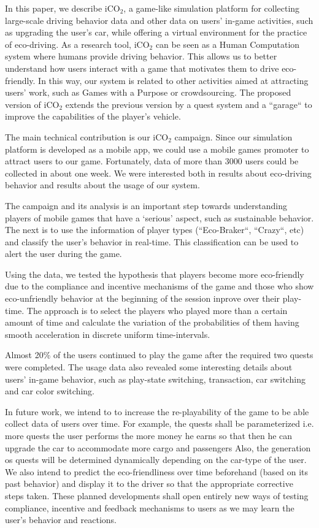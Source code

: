 \documentclass[preprint,authoryear,12pt]{elsarticle}
\begin{document}
In this paper, we describe iCO$_2$, a game-like simulation platform for collecting large-scale driving behavior data and other data on users' in-game activities, such as upgrading the user's car, while offering a virtual environment for the practice of eco-driving. As a research tool, iCO$_2$ can be seen as a Human Computation system where humans provide driving behavior. This allows us to better understand how users interact with a game that motivates them to drive eco-friendly. In this way, our system is related to other activities aimed at attracting users' work, such as Games with a Purpose or crowdsourcing. The proposed version of iCO$_2$ extends the previous version \citep{prendingeroliveira2014} by a quest system and a ``garage`` to improve the capabilities of the player's vehicle.

The main technical contribution is our iCO$_2$ campaign. Since our simulation platform is developed as a mobile app, we could use a mobile games promoter to attract users to our game. Fortunately, data of more than 3000 users could be collected in about one week. We were interested both in results about eco-driving behavior and results about the usage of our system.

The campaign and its analysis is an important step towards understanding players of mobile games that have a `serious' aspect, such as sustainable behavior. The next is to use the information of player types (``Eco-Braker``, ``Crazy``, etc) and classify the user's behavior in real-time. This classification can be used to alert the user during the game.

Using the data, we tested the hypothesis that players become more eco-friendly due to the compliance and incentive mechanisms of the game and those who show eco-unfriendly behavior at the beginning of the session inprove over their play-time. The approach is to select the players who played more than a certain amount of time and calculate the variation of the probabilities of them having smooth acceleration in discrete uniform time-intervals.

Almost 20\% of the users continued to play the game after the required two quests were completed. The usage data also revealed some interesting details about users' in-game behavior, such as play-state switching, transaction, car switching and car color switching.

In future work, we intend to to increase the re-playability of the game to be able collect data of users over time. For example, the quests shall be parameterized i.e. more quests the user performs the more money he earns so that then he can upgrade the car to accommodate more cargo and passengers Also, the generation os quests will be determined dynamically depending on the car-type of the user. We also intend to predict the eco-friendliness over time beforehand (based on its past behavior) and display it to the driver so that the appropriate corrective steps taken. These planned developments shall open entirely new ways of testing compliance, incentive and feedback mechanisms to users as we may learn the user's behavior and reactions. 
\end{document}
